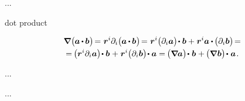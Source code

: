 \begin{otherlanguage}{russian}
...

 dot product 

\nopagebreak\vspace{-0.4em}\begin{multline}\label{gradientofdotproductoftwovectors}
\boldnabla \hspace{.1ex} \bigl( \hspace{-0.05ex} \bm{a} \hspace{-0.1ex} \dotp \hspace{-0.1ex} \bm{b} \hspace{.05ex} \bigr) \hspace{-0.3ex}
= \hspace{.1ex} \bm{r}^i \partial_i \bigl( \hspace{-0.05ex} \bm{a} \hspace{-0.1ex} \dotp \hspace{-0.1ex} \bm{b} \hspace{.05ex} \bigr) \hspace{-0.33ex}
= \hspace{.1ex} \bm{r}^i \bigl( \partial_i \bm{a} \bigr) \hspace{-0.32ex} \dotp \bm{b} + \hspace{.1ex} \bm{r}^i \bm{a} \hspace{-0.05ex} \dotp \hspace{-0.15ex} \bigl( \partial_i \bm{b} \bigr)  \hspace{-0.33ex} =
\\[-0.1em]
%
= \hspace{-0.2ex} \bigl( \bm{r}^i \partial_i \bm{a} \bigr) \hspace{-0.32ex} \dotp \bm{b} \hspace{.1ex} + \hspace{.1ex} \bm{r}^i \bigl( \partial_i \bm{b} \bigr) \hspace{-0.33ex} \dotp \bm{a}
= \hspace{-0.16ex} \bigl( \boldnabla \hspace{-0.1ex} \bm{a} \bigr) \hspace{-0.3ex} \dotp \hspace{.1ex} \bm{b} \hspace{.1ex} + \hspace{-0.1ex} \bigl( \boldnabla \hspace{.1ex} \bm{b} \bigr) \hspace{-0.27ex} \dotp \hspace{.1ex} \bm{a}
\hspace{.2ex} .
\end{multline}

\newpage ...

\newpage ...



\end{otherlanguage}


